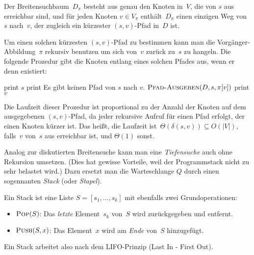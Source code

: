 \begin{aufg}
Der Breitensuchbaum~$D_\pi$ besteht aus genau den Knoten in~$V$, die von $s$ aus erreichbar sind, und für jeden Knoten $v \in V_\pi$ enthält~$D_\pi$ einen einzigen Weg von~$s$ nach~$v$, der zugleich ein kürzester $(s,v)$-Pfad in~$D$ ist.
\end{aufg}

\begin{bem}
Um einen solchen kürzesten $(s,v)$-Pfad zu bestimmen kann man die Vorgänger-Abbildung~$\pi$ rekursiv benutzen um \glqq sich von~$v$ zurück zu~$s$ zu hangeln\grqq.
Die folgende Prozedur gibt die Knoten entlang eines solchen Pfades aus, wenn er denn existiert:

\begin{algorithm}[H]
\caption{$\cc{Pfad-Ausgeben}(D,s,v)$}
\begin{algorithmic}[1]
  \STATE print $s$
  \STATE print \glqq Es gibt keinen Pfad von $s$ nach $v$.\grqq
 \ELSE
  \STATE $\mathop{\text{\textsc{Pfad-Ausgeben}}}(D,s,\pi[v])$
  \STATE print $v$
 \ENDIF
\end{algorithmic}
\end{algorithm}

Die Laufzeit dieser Prozedur ist proportional zu der Anzahl der Knoten auf dem ausgegebenen $(s,v)$-Pfad, da jeder rekursive Aufruf für einen Pfad erfolgt, der einen Knoten kürzer ist.
Das heißt, die Laufzeit ist~$\Theta(\delta(s,v)) \subseteq O(|V|)$, falls~$v$ von~$s$ aus erreichbar ist, und $\Theta(1)$ sonst.
\end{bem}

\begin{bem}
Analog zur diskutierten Breitensuche kann man eine \emph{Tiefensuche} auch ohne Rekursion umsetzen.
(Dies hat gewisse Vorteile, weil der Programmstack nicht zu sehr belastet wird.)
Dazu ersetzt man die Warteschlange $Q$ durch einen sogennanten \emph{Stack} (oder \emph{Stapel}). 

Ein Stack ist eine Liste $S=[s_1,\ldots,s_k]$ mit ebenfalls zwei Grundoperationen:
\begin{itemize}
 \item $\mathop{\text{\textsc{Pop}}}(S)$: Das \emph{letzte} Element~$s_k$ von~$S$ wird zurückgegeben und entfernt.

 \item $\mathop{\text{\textsc{Push}}}(S,x)$: Das Element~$x$ wird am \emph{Ende} von~$S$ hinzugefügt.
\end{itemize}

Ein Stack arbeitet also nach dem LIFO-Prinzip (Last In - First Out).
\end{bem}